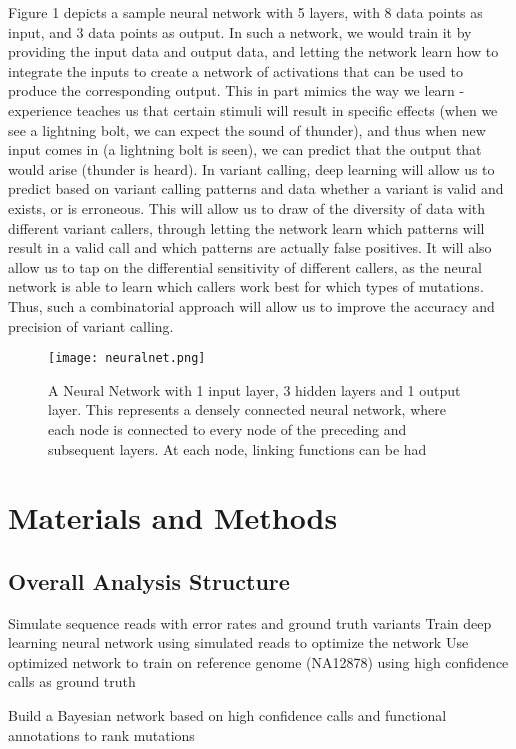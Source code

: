 \documentclass{article}
\begin{document}
Figure 1 depicts a sample neural network with 5 layers, with 8 data points as input, and 3 data points as output. In such a network, we would train it by providing the input data and output data, and letting the network learn how to integrate the inputs to create a network of activations that can be used to produce the corresponding output. This in part mimics the way we learn - experience teaches us that certain stimuli will result in specific effects (when we see a lightning bolt, we can expect the sound of thunder), and thus when new input comes in (a lightning bolt is seen), we can predict that the output that would arise (thunder is heard). In variant calling, deep learning will allow us to predict based on variant calling patterns and data whether a variant is valid and exists, or is erroneous. This will allow us to draw of the diversity of data with different variant callers, through letting the network learn which patterns will result in a valid call and which patterns are actually false positives. It will also allow us to tap on the differential sensitivity of different callers, as the neural network is able to learn which callers work best for which types of mutations. Thus, such a combinatorial approach will allow us to improve the accuracy and precision of variant calling.\\

\begin{figure}[h]
\texttt{[image: neuralnet.png]}
\centering
\caption{A Neural Network with 1 input layer, 3 hidden layers and 1 output layer. This represents a densely connected neural network, where each node is connected to every node of the preceding and subsequent layers. At each node, linking functions can be had }
\end{figure}


\section{Materials and Methods}

\subsection{Overall Analysis Structure}
Simulate sequence reads with error rates and ground truth variants
Train deep learning neural network using simulated reads to optimize the network
Use optimized network to train on reference genome (NA12878) using high confidence calls as ground truth

Build a Bayesian network based on high confidence calls and functional annotations to rank mutations
\end{document}
